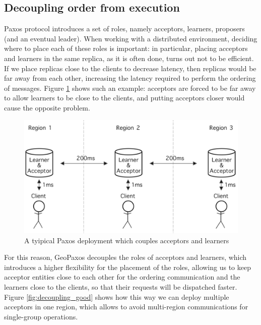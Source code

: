 \subsection{Decoupling order from execution}
Paxos protocol introduces a set of roles, namely acceptors, learners, proposers (and an eventual leader). When working with a distributed environment, deciding where to place each of these roles is important: in particular, placing acceptors and learners in the same replica, as it is often done, turns out not to be efficient. If we place replicas close to the clients to decrease latency, then  replicas would be far away from each other, increasing the latency required to perform the ordering of messages. Figure \ref{fig:decoupling_bad} shows such an example: acceptors are forced to be far away to allow learners to be close to the clients, and putting  acceptors closer would cause the opposite problem.
\begin{figure}[htb]
  \centering
  \includegraphics[width=\textwidth,height=\textheight,keepaspectratio]{img/decoupling_bad.png}
  \caption{A tyipical Paxos deployment which couples acceptors and learners}
  \label{fig:decoupling_bad}
\end{figure}

For this reason, GeoPaxos decouples the roles of acceptors and learners, which introduces a higher flexibility for the placement of the roles, allowing us to keep acceptor entities close to each other for the ordering communication and the learners close to the clients, so that their requests will be dispatched faster. Figure \ref{fig:decoupling_good} shows how this way we can deploy multiple acceptors in one region, which allows to avoid multi-region communications for single-group operations.

